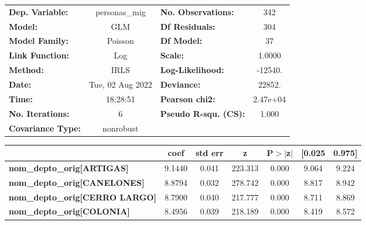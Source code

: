 \begin{center}
\begin{tabular}{lclc}
\toprule
\textbf{Dep. Variable:}                    &  personas\_mig   & \textbf{  No. Observations:  } &      342    \\
\textbf{Model:}                            &       GLM        & \textbf{  Df Residuals:      } &      304    \\
\textbf{Model Family:}                     &     Poisson      & \textbf{  Df Model:          } &       37    \\
\textbf{Link Function:}                    &       Log        & \textbf{  Scale:             } &    1.0000   \\
\textbf{Method:}                           &       IRLS       & \textbf{  Log-Likelihood:    } &   -12540.   \\
\textbf{Date:}                             & Tue, 02 Aug 2022 & \textbf{  Deviance:          } &    22852.   \\
\textbf{Time:}                             &     18:28:51     & \textbf{  Pearson chi2:      } &  2.47e+04   \\
\textbf{No. Iterations:}                   &        6         & \textbf{  Pseudo R-squ. (CS):} &    1.000    \\
\textbf{Covariance Type:}                  &    nonrobust     & \textbf{                     } &             \\
\bottomrule
\end{tabular}
\begin{tabular}{lcccccc}
                                           & \textbf{coef} & \textbf{std err} & \textbf{z} & \textbf{P$> |$z$|$} & \textbf{[0.025} & \textbf{0.975]}  \\
\midrule
\textbf{nom\_depto\_orig[ARTIGAS]}         &       9.1440  &        0.041     &   223.313  &         0.000        &        9.064    &        9.224     \\
\textbf{nom\_depto\_orig[CANELONES]}       &       8.8794  &        0.032     &   278.742  &         0.000        &        8.817    &        8.942     \\
\textbf{nom\_depto\_orig[CERRO LARGO]}     &       8.7900  &        0.040     &   217.777  &         0.000        &        8.711    &        8.869     \\
\textbf{nom\_depto\_orig[COLONIA]}         &       8.4956  &        0.039     &   218.189  &         0.000        &        8.419    &        8.572     \\

\end{tabular}
\end{center}
